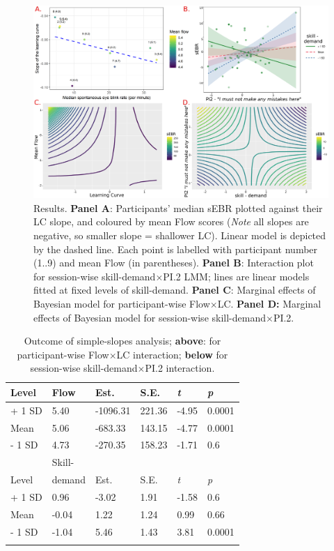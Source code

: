 \documentclass[10pt,letterpaper,floatsintext]{article}
\begin{document}
\begin{figure}[!t]
	\centering
	\includegraphics[width=\textwidth]{sEBR_RQ1-2_results}
	\caption{Results. \textbf{Panel A}: Participants' median sEBR plotted against their LC slope, and coloured by mean Flow scores (\textit{Note} all slopes are negative, so smaller slope = shallower LC). Linear model is depicted by the dashed line. Each point is labelled with participant number (1..9) and mean Flow (in parentheses). \textbf{Panel B}: Interaction plot for session-wise skill-demand$\times$PI.2 LMM; lines are linear models fitted at fixed levels of skill-demand. \textbf{Panel C}: Marginal effects of Bayesian model for participant-wise Flow$\times$LC. \textbf{Panel D:} Marginal effects of Bayesian model for session-wise skill-demand$\times$PI.2.}
	\label{fig:EBRvLC}
\end{figure}


\begin{table}[!hb]
\centering
\caption{Outcome of simple-slopes analysis; \textbf{above}: for participant-wise Flow$\times$LC interaction; \textbf{below} for session-wise skill-demand$\times$PI.2 interaction.}
\begin{tabular}{llllll}
\hline
Level  & Flow & Est.     & S.E.   & \textit{t} & \textit{p} \\
\hline
+ 1 SD & 5.40 & -1096.31 & 221.36 & -4.95 & 0.0001 \\
Mean   & 5.06 &  -683.33 & 143.15 & -4.77 & 0.0001 \\
- 1 SD & 4.73 &  -270.35 & 158.23 & -1.71 & 0.6 \\
\hline
       & Skill- &      &      &            & \\
Level  & demand & Est. & S.E. & \textit{t} & \textit{p} \\
\hline
+ 1 SD & 0.96 &    -3.02 &   1.91 & -1.58 & 0.6 \\
Mean   &-0.04 &     1.22 &   1.24 &  0.99 & 0.66 \\
- 1 SD &-1.04 &     5.46 &   1.43 &  3.81 & 0.0001 \\
\hline
\label{tab:simpslopes}
\end{tabular}
\end{table}
\end{document}
